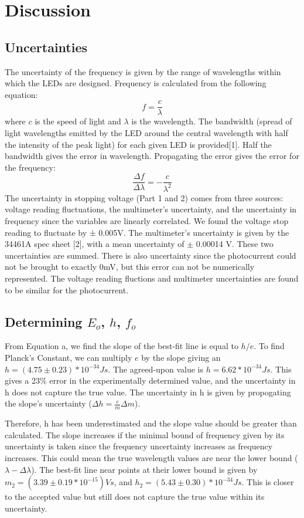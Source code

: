 \documentclass[12pt,twocolumn]{article}
\begin{document}
\section{Discussion}
\subsection*{Uncertainties}
The uncertainty of the frequency is given by the range of wavelengths within which the LEDs are designed. Frequency is calculated from the following equation:
\begin{equation}
    f = \frac{c}{\lambda}
\end{equation}
where $c$ is the speed of light and $\lambda$ is the wavelength.
The bandwidth (spread of light wavelengths emitted by the LED around the central wavelength
with half the intensity of the peak light) for each given LED is provided[1]. Half the bandwidth gives the error in wavelength. Propagating the error gives the error for the frequency:
\begin{equation}
    \frac{\Delta f}{\Delta \lambda} = -\frac{c}{\lambda^2}  
\end{equation}
The uncertainty in stopping voltage (Part 1 and 2) comes from three sources: voltage reading fluctuations, the multimeter's uncertainty, and the uncertainty in frequency since the variables are linearly correlated. We found the voltage stop reading to fluctuate by ± 0.005V. The multimeter's uncertainty is given by the 34461A spec sheet [2], with a mean uncertainty of $\pm$ 0.00014 V. 
These two uncertainties are summed. There is also uncertainty since the photocurrent could not be brought to exactly 0mV, but this error can not be numerically represented.
The voltage reading fluctions and multimeter uncertainties are found to be similar for the photocurrent.

\subsection{Determining $E_o$, $h$, $f_o$}
From Equation a, we find the slope of the best-fit line is equal to $h/e$. To find Planck's Constant, we can multiply $e$ by the slope giving an $h = (4.75 \pm 0.23)*10^{-34} Js$. The agreed-upon value is $h = 6.62*10^{-34}Js$. This gives a 23\% error in the experimentally determined value, and the uncertainty in h does not capture the true value. The uncertainty in h is given by propogating the slope's uncertainty ($\Delta h = \frac{e}{m} \Delta m$).

Therefore, h has been underestimated and the slope value should be greater than calculated. The slope increases if the minimal bound of frequency given by its uncertainty is taken since the frequency uncertainty increases as frequency increases. This could mean the true wavelength values are near the lower bound ($\lambda - \Delta \lambda$). The best-fit line near points at their lower bound is given by $m_2 = (3.39\pm0.19*10^{-15}) Vs$, and $h_2 = (5.43\pm0.30)*10^{-34} Js$. This is closer to the accepted value but still does not capture the true value within its uncertainty.
\end{document}
